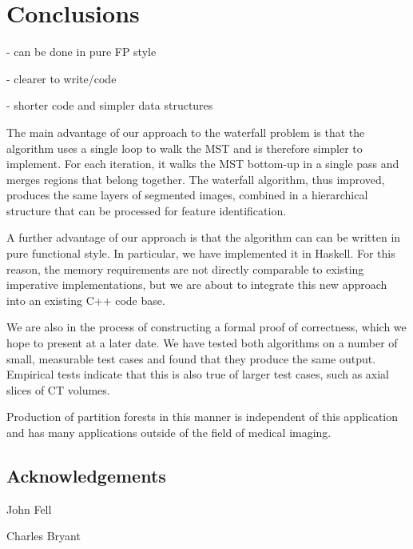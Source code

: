 \documentclass{jfp}
\begin{document}
\section{Conclusions}

 - can be done in pure FP style


 - clearer to write/code

 - shorter code and simpler data structures


The main advantage of our approach to the waterfall problem is that
the algorithm uses a single loop to walk the MST and is therefore
simpler to implement. For each iteration, it walks the MST bottom-up
in a single pass and merges regions that belong together. The
waterfall algorithm, thus improved, produces the same layers of
segmented images, combined in a hierarchical structure that can be
processed for feature identification.

A further advantage of our approach is that the algorithm can can be
written in pure functional style. In particular, we have implemented
it in Haskell. For this reason, the memory requirements are not
directly comparable to existing imperative implementations, but we are
about to integrate this new approach into an existing C++ code base.

We are also in the process of constructing a formal proof of
correctness, which we hope to present at a later date. We have tested
both algorithms on a number of small, measurable test cases and found
that they produce the same output. Empirical tests indicate that this
is also true of larger test cases, such as axial slices of CT volumes.

Production of partition forests in this manner is independent of this
application and has many applications outside of the field of medical
imaging.

\subsection{Acknowledgements}

John Fell

Charles Bryant



\end{document}
